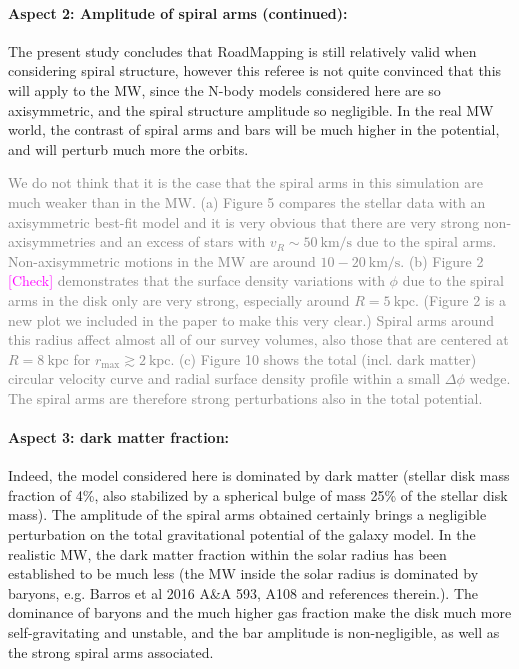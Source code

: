 \documentclass[10pt,a4paper]{article}
\newcommand{\Wilma}[1]{\textcolor{Magenta}{#1}}
\newcommand{\Answer}[1]{\textcolor{Gray}{#1}}
\begin{document}
\paragraph{Aspect 2: Amplitude of spiral arms (continued):} The present study concludes that RoadMapping is still relatively valid when considering spiral structure, however this referee is not quite convinced that this
will apply to the MW, since the N-body models considered here are so axisymmetric,
and the spiral structure amplitude so negligible. In the real MW world, the contrast
of spiral arms and bars will be much higher in the potential, and will perturb much
more the orbits.  

\Answer{We do not think that it is the case that the spiral arms in this simulation are much weaker than in the MW. (a) Figure 5 compares the stellar data with an axisymmetric best-fit model and it is very obvious that there are very strong non-axisymmetries and an excess of stars with $v_R\sim 50~\text{km/s}$ due to the spiral arms. Non-axisymmetric motions in the MW are around $10-20~\text{km/s}$. (b) Figure 2 \Wilma{[Check]} demonstrates that the surface density variations with $\phi$ due to the spiral arms in the disk only are very strong, especially around $R=5~\text{kpc}$. (Figure 2 is a new plot we included in the paper to make this very clear.) Spiral arms around this radius affect almost all of our survey volumes, also those that are centered at $R=8~\text{kpc}$ for $r_\text{max}\gtrsim2~\text{kpc}$. (c) Figure 10 shows the total (incl. dark matter) circular velocity curve and radial surface density profile within a small $\Delta \phi$ wedge. The spiral arms are therefore strong perturbations also in the total potential.}

\paragraph{Aspect 3: dark matter fraction:} Indeed, the model considered here is dominated by dark matter (stellar disk mass fraction of 4\%, also stabilized by a spherical bulge of mass 25\% of the stellar disk mass). The amplitude of the spiral arms obtained certainly brings a negligible
perturbation on the total gravitational potential of the galaxy model. In the
realistic MW, the dark matter fraction within the solar radius has been established
to be much less (the MW inside the solar radius is dominated by baryons, e.g. Barros
et al 2016 A\&A 593, A108 and references therein.). The dominance of baryons and the
much higher gas fraction make the disk much more self-gravitating and unstable, and
the bar amplitude is non-negligible, as well as the strong spiral arms associated.
\end{document}
